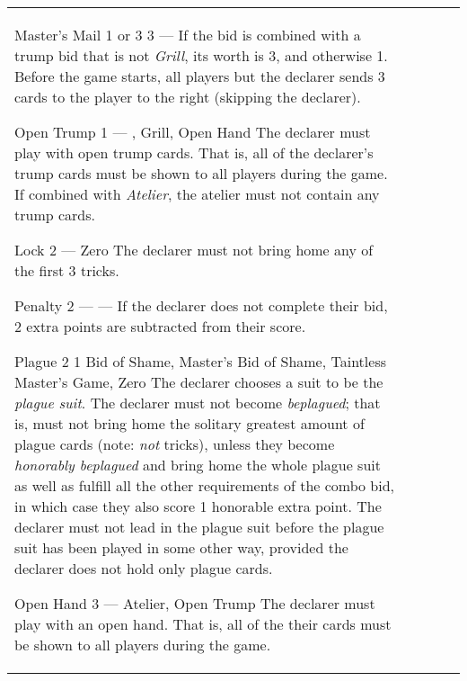 \begin{center}
\begin{tabularx}{\textwidth}{
			l
			S[table-number-alignment=center, table-format=1.0]
			S[table-number-alignment=center, table-format=1.0]
			p{3cm}
			|X
		}
			\specialBidItem%
			{Master's Mail}
			{{1 or 3}}
			{3}
			{---}
			{%
				If the bid is combined with a trump bid that is not \emph{Grill}, its worth is 3, and otherwise 1. Before the game starts, all players but the declarer sends 3 cards to the player to the right (skipping the declarer).
			}

			\specialBidItem%
			{Open Trump}
			{1}
			{{---}}
			{\nonTrump, Grill, Open Hand}
			{%
				The declarer must play with open trump cards. That is, all of the declarer’s trump cards must be shown to all players during the game. If combined with \emph{Atelier}, the atelier must not contain any trump cards.
			}

			\specialBidItem%
			{Lock}
			{2}
			{{---}}
			{Zero}
			{%
				The declarer must not bring home any of the first 3 tricks.
			}

			\specialBidItem%
			{Penalty}
			{2}
			{{---}}
			{---}
			{%
				If the declarer does not complete their bid, 2 extra points are subtracted from their score.
			}

			\specialBidItem%
			{Plague}
			{2}
			{1}
			{Bid of Shame, Master's Bid of Shame, Taintless Master's Game, Zero}
			{%
				The declarer chooses a suit to be the \emph{plague suit}. The declarer must not become \emph{beplagued}; that is, must not bring home the solitary greatest amount of plague cards (note: \emph{not} tricks), unless they become \emph{honorably beplagued} and bring home the whole plague suit as well as fulfill all the other requirements of the combo bid, in which case they also score 1 honorable extra point. The declarer must not lead in the plague suit before the plague suit has been played in some other way, provided the declarer does not hold only plague cards.
			}

			\specialBidItem%
			{Open Hand}
			{3}
			{{---}}
			{Atelier, Open Trump}
			{%
				The declarer must play with an open hand. That is, all of the their cards must be shown to all players during the game.
			}
		\end{tabularx}
	\end{center}
